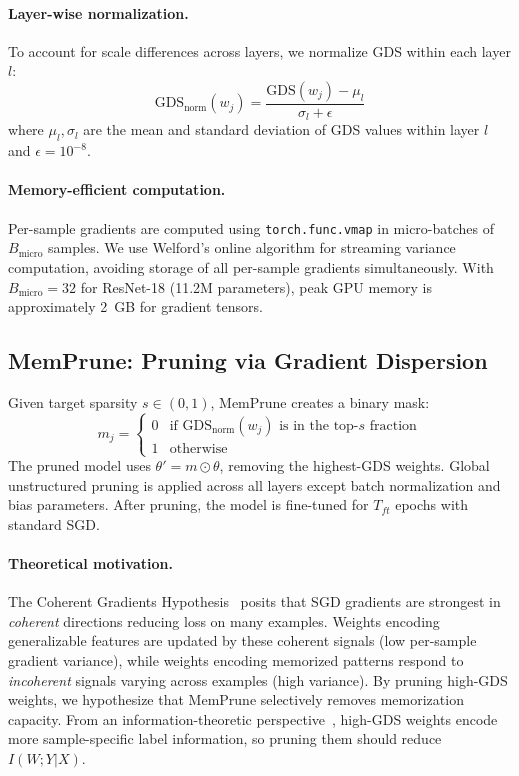\documentclass{article}
\newcommand{\gds}{\text{GDS}}
\newcommand{\gdsnorm}{\text{GDS}_{\text{norm}}}
\begin{document}
\paragraph{Layer-wise normalization.} To account for scale differences across layers, we normalize GDS within each layer $l$:
\begin{equation}
    \gdsnorm(w_j) = \frac{\gds(w_j) - \mu_l}{\sigma_l + \epsilon}
\end{equation}
where $\mu_l, \sigma_l$ are the mean and standard deviation of GDS values within layer $l$ and $\epsilon = 10^{-8}$.

\paragraph{Memory-efficient computation.} Per-sample gradients are computed using \texttt{torch.func.vmap} in micro-batches of $B_{\text{micro}}$ samples. We use Welford's online algorithm for streaming variance computation, avoiding storage of all per-sample gradients simultaneously. With $B_{\text{micro}} = 32$ for ResNet-18 (11.2M parameters), peak GPU memory is approximately 2~GB for gradient tensors.

\subsection{MemPrune: Pruning via Gradient Dispersion}

Given target sparsity $s \in (0,1)$, MemPrune creates a binary mask:
\begin{equation}
    m_j = \begin{cases} 0 & \text{if } \gdsnorm(w_j) \text{ is in the top-}s \text{ fraction} \\ 1 & \text{otherwise} \end{cases}
\end{equation}
The pruned model uses $\theta' = m \odot \theta$, removing the highest-GDS weights. Global unstructured pruning is applied across all layers except batch normalization and bias parameters. After pruning, the model is fine-tuned for $T_{ft}$ epochs with standard SGD.

\paragraph{Theoretical motivation.} The Coherent Gradients Hypothesis~\citep{chatterjee2020coherent} posits that SGD gradients are strongest in \emph{coherent} directions reducing loss on many examples. Weights encoding generalizable features are updated by these coherent signals (low per-sample gradient variance), while weights encoding memorized patterns respond to \emph{incoherent} signals varying across examples (high variance). By pruning high-GDS weights, we hypothesize that MemPrune selectively removes memorization capacity. From an information-theoretic perspective~\citep{harutyunyan2020improving}, high-GDS weights encode more sample-specific label information, so pruning them should reduce $I(W; Y|X)$.
\end{document}
